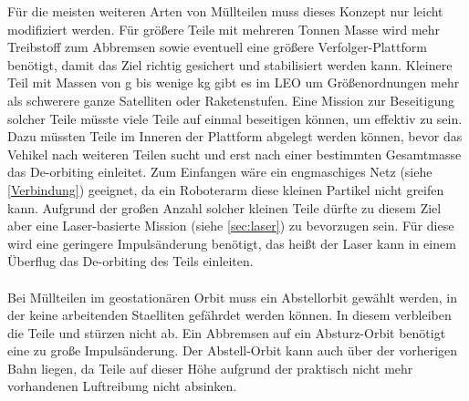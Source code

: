 \documentclass{article}
\begin{document}
Für die meisten weiteren Arten von Müllteilen muss dieses Konzept nur leicht modifiziert werden. Für größere Teile mit mehreren Tonnen Masse wird mehr Treibstoff zum Abbremsen sowie eventuell eine größere Verfolger-Plattform benötigt, damit das Ziel richtig gesichert und stabilisiert werden kann. Kleinere Teil mit Massen von g bis wenige kg gibt es im LEO um Größenordnungen mehr als schwerere ganze Satelliten oder Raketenstufen. Eine Mission zur Beseitigung solcher Teile müsste viele Teile auf einmal beseitigen können, um effektiv zu sein. Dazu müssten Teile im Inneren der Plattform abgelegt werden können, bevor das Vehikel nach weiteren Teilen sucht und erst nach einer bestimmten Gesamtmasse das De-orbiting einleitet. Zum Einfangen wäre ein engmaschiges Netz (siehe \autoref{Verbindung}) geeignet, da ein Roboterarm diese kleinen Partikel nicht greifen kann. Aufgrund der großen Anzahl solcher kleinen Teile dürfte zu diesem Ziel aber eine Laser-basierte Mission (siehe \autoref{sec:laser}) zu bevorzugen sein. Für diese wird eine geringere Impulsänderung benötigt, das heißt der Laser kann in einem Überflug das De-orbiting des Teils einleiten. \\\\
Bei Müllteilen im geostationären Orbit muss ein Abstellorbit gewählt werden, in der keine arbeitenden Staelliten gefährdet werden können. In diesem verbleiben die Teile und stürzen nicht ab. Ein Abbremsen auf ein Absturz-Orbit benötigt eine zu große Impulsänderung. Der Abstell-Orbit kann auch über der vorherigen Bahn liegen, da Teile auf dieser Höhe aufgrund der praktisch nicht mehr vorhandenen Luftreibung nicht absinken.
\end{document}
